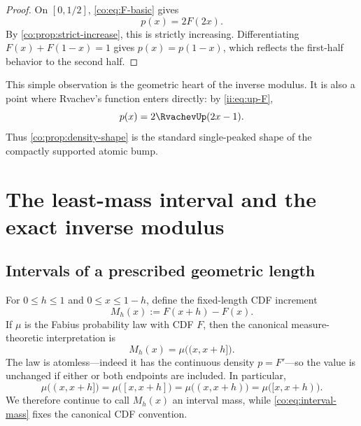 \begin{proof}
On $[0,1/2]$, \eqref{co:eq:F-basic} gives
\[
 p(x)=2F(2x).
\]
By \cref{co:prop:strict-increase}, this is strictly increasing.  Differentiating
$F(x)+F(1-x)=1$ gives $p(x)=p(1-x)$, which reflects the first-half behavior
to the second half.
\end{proof}

This simple observation is the geometric heart of the inverse modulus.  It is
also a point where Rvachev's function enters directly: by
\eqref{ii:eq:up-F},
\begin{equation}\label{co:eq:p-up}
 p(x)=2\RvachevUp(2x-1).
\end{equation}
Thus \cref{co:prop:density-shape} is the standard single-peaked shape of the
compactly supported atomic bump.

\section{The least-mass interval and the exact inverse modulus}
\label{co:sec:exact-modulus}

\subsection{Intervals of a prescribed geometric length}

For $0\le h\le1$ and $0\le x\le1-h$, define the fixed-length CDF increment
\begin{equation}\label{co:eq:interval-mass}
 M_h(x):=F(x+h)-F(x).
\end{equation}
If $\mu$ is the Fabius probability law with CDF $F$, then the canonical
measure-theoretic interpretation is
\[
 M_h(x)=\mu\bigl((x,x+h]\bigr).
\]
The law is atomless---indeed it has the continuous density $p=F'$---so the
value is unchanged if either or both endpoints are included.  In particular,
\[
 \mu\bigl((x,x+h]\bigr)
 =\mu\bigl([x,x+h]\bigr)
 =\mu\bigl((x,x+h)\bigr)
 =\mu\bigl([x,x+h)\bigr).
\]
We therefore continue to call $M_h(x)$ an interval mass, while
\eqref{co:eq:interval-mass} fixes the canonical CDF convention.

